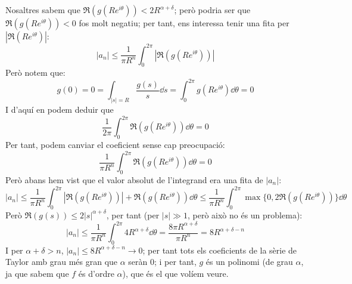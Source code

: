 \documentclass{report}
\begin{document}
{\[    \]
    Nosaltres sabem que $\Re(g(Re^{i\theta}))<2R^{\alpha+\delta}$; però podria ser que $\Re(g(Re^{i\theta}))<0$ fos molt negatiu; per tant, ens interessa tenir una fita per $|\Re(Re^{i\theta})|$:
    \[
        |a_n|\leq\frac{1}{\pi R^n}\int_0^{2\pi}|\Re(g(Re^{i\theta}))|
    \]
    Però notem que:
    \[
        g(0)=0=\int_{|s|=R}\frac{g(s)}s\dd s=\int_0^{2\pi}g(Re^{i\theta})\dd \theta=0
    \]
    I d'aquí en podem deduir que 
    \[
        \frac{1}{2\pi}\int_0^{2\pi}\Re(g(Re^{i\theta}))\dd \theta = 0
    \]
    Per tant, podem canviar el coeficient sense cap preocupació:
    \[
        \frac{1}{\pi R^n}\int_0^{2\pi}\Re(g(Re^{i\theta}))\dd \theta = 0
    \]
    Però abans hem vist que el valor absolut de l'integrand era una fita de $|a_n|$:
    \[
        |a_n|\leq \frac{1}{\pi R^n}\int_0^{2\pi}\left|\Re(g(Re^{i\theta}))\right|+\Re(g(Re^{i\theta}))\dd \theta\leq\frac{1}{\pi R^n}\int_0^{2\pi}\max\{0,2\Re(g(Re^{i\theta}))\}\dd\theta
    \]
    Però $\Re(g(s))\leq 2|s|^{\alpha+\delta}$, per tant (per $|s|\gg1$, però això no és un problema):
    \[
        |a_n|\leq \frac{1}{\pi R^n}\int_0^{2\pi}4R^{\alpha+\delta}\dd\theta=\frac{8\pi R^{\alpha+\delta}}{\pi R^n}=8R^{\alpha+\delta-n}
    \]
    I per $\alpha+\delta>n$, $|a_n|\leq 8R^{\alpha+\delta-n}\to 0$; per tant tots els coeficients de la sèrie de Taylor amb grau més gran que $\alpha$ seràn 0; i per tant, $g$ és un polinomi (de grau $\alpha$, ja que sabem que $f$ és d'ordre $\alpha$), que és el que volíem veure.
}
\newpage
\end{document}
